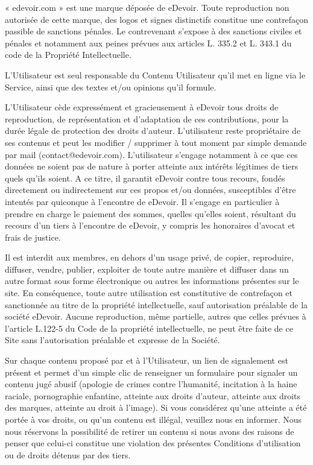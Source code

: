 « edevoir.com » est une marque déposée de eDevoir. Toute reproduction non autorisée de cette marque, des logos et signes distinctifs constitue une contrefaçon passible de sanctions pénales. Le contrevenant s'expose à des sanctions civiles et pénales et notamment aux peines prévues aux articles L. 335.2 et L. 343.1 du code de la Propriété Intellectuelle.

L’Utilisateur est seul responsable du Contenu Utilisateur qu’il met en ligne via le Service, ainsi que des textes et/ou opinions qu’il formule.

L'Utilisateur cède expressément et gracieusement à eDevoir tous droits de reproduction, de représentation et d'adaptation de ces contributions, pour la durée légale de protection des droits d'auteur. L'utilisateur reste propriétaire de ses contenus et peut les modifier / supprimer à tout moment par simple demande par mail (contact@edevoir.com). L'utilisateur s’engage notamment à ce que ces données ne soient pas de nature à porter atteinte aux intérêts légitimes de tiers quels qu’ils soient. A ce titre, il garantit eDevoir contre tous recours, fondés directement ou indirectement sur ces propos et/ou données, susceptibles d’être intentés par quiconque à l’encontre de eDevoir. Il s’engage en particulier à prendre en charge le paiement des sommes, quelles qu’elles soient, résultant du recours d'un tiers à l'encontre de eDevoir, y compris les honoraires d’avocat et frais de justice.

Il est interdit aux membres, en dehors d'un usage privé, de copier, reproduire, diffuser, vendre, publier, exploiter de toute autre manière et diffuser dans un autre format sous forme électronique ou autres les informations présentes sur le site. En conséquence, toute autre utilisation est constitutive de contrefaçon et sanctionnée au titre de la propriété intellectuelle, sauf autorisation préalable de la société eDevoir. Aucune reproduction, même partielle, autres que celles prévues à l'article L.122-5 du Code de la propriété intellectuelle, ne peut être faite de ce Site sans l'autorisation préalable et expresse de la Société.

Sur chaque contenu proposé par et à l'Utilisateur, un lien de signalement est présent et permet d'un simple clic de renseigner un formulaire pour signaler un contenu jugé abusif (apologie de crimes contre l'humanité, incitation à la haine raciale, pornographie enfantine, atteinte aux droits d'auteur, atteinte aux droits des marques, atteinte au droit à l'image). Si vous considérez qu'une atteinte a été portée à vos droits, ou qu’un contenu est illégal, veuillez nous en informer. Nous nous réservons la possibilité de retirer un contenu si nous avons des raisons de penser que celui-ci constitue une violation des présentes Conditions d'utilisation ou de droits détenus par des tiers.


